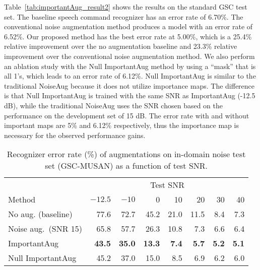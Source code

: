 \documentclass{article}
\begin{document}
Table~\ref{tab:importantAug_result2} shows the results on the standard GSC test set. The baseline speech command recognizer has an error rate of 6.70\%. The conventional noise augmentation method produces a model with an error rate of 6.52\%. Our proposed method has the best error rate at 5.00\%, which is a 25.4\% relative improvement over the no augmentation baseline and 23.3\% relative improvement over the conventional noise augmentation method. We also perform an ablation study with the Null ImportantAug method by using a ``mask'' that is all 1's, which leads to an error rate of 6.12\%. Null ImportantAug is similar to the traditional NoiseAug because it does not utilize importance maps. The difference is that Null ImportantAug is trained with the same SNR as ImportantAug (-12.5 dB), while the traditional NoiseAug uses the SNR chosen based on the
performance on the development set of 15 dB. The error rate with and without important maps are 5\% and 6.12\% respectively,  thus the importance map is necessary for the observed performance gains.

\begin{table}
  \caption{Recognizer error rate (\%) of augmentations on in-domain noise test set (GSC-MUSAN) as a function of test SNR.}\label{tab:importantAug_result_MUSAN}
  \begin{center}
  \scriptsize
    \begin{tabular}{lrrrrrrr}
    \toprule
    & \multicolumn{7}{c}{Test SNR} \\
     Method &  $-12.5$ &$-10$ &0 & 10 & 20 & 30 &40 \\
     \midrule
     No aug. (baseline) & 77.6 & 72.7 & 45.2 & 21.0 & 11.5 & 8.4 & 7.3 \\
       Noise aug.~(SNR 15) & 65.8 & 57.7 & 26.3 & 10.8 & 7.3 & 6.6 & 6.4  \\
        ImportantAug & \textbf{43.5} & \textbf{35.0} & \textbf{13.3} & \textbf{7.4} & \textbf{5.7} & \textbf{5.2} & \textbf{5.1}   \\
        Null ImportantAug & 45.2 & 37.0 & 15.0 & 8.5 & 6.9 & 6.2 & 6.0  \\
      \bottomrule
    \end{tabular}
  \end{center}
\end{table}
\end{document}
